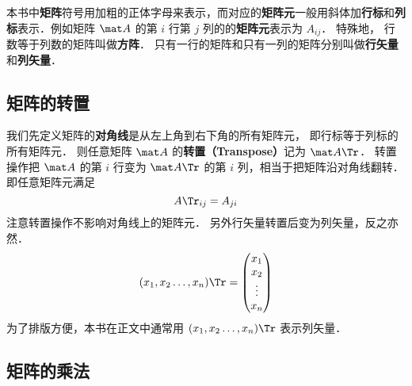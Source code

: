 

本书中\textbf{矩阵}符号用加粗的正体字母来表示，而对应的\textbf{矩阵元}一般用斜体加\textbf{行标}和\textbf{列标}表示．例如矩阵 $\mat A$ 的第 $i$ 行第 $j$ 列的的\textbf{矩阵元}表示为 $A_{ij}$． 特殊地， 行数等于列数的矩阵叫做\textbf{方阵}． 只有一行的矩阵和只有一列的矩阵分别叫做\textbf{行矢量}和\textbf{列矢量}．

\subsection{矩阵的转置}

我们先定义矩阵的\textbf{对角线}是从左上角到右下角的所有矩阵元， 即行标等于列标的所有矩阵元． 则任意矩阵 $\mat A$ 的\textbf{转置（Transpose）}记为 $\mat A\Tr$． 转置操作把 $\mat A$ 的第 $i$ 行变为 $\mat A\Tr$ 的第 $i$ 列，相当于把矩阵沿对角线翻转． 即任意矩阵元满足
\begin{equation}\label{Mat_eq3}
A\Tr_{ij} = A_{ji}
\end{equation}
注意转置操作不影响对角线上的矩阵元． 另外行矢量转置后变为列矢量，反之亦然．
\begin{equation}\label{Mat_eq2}
(x_1,x_2 \dots, x_n)\Tr = \begin{pmatrix} x_1\\x_2\\ \vdots\\x_n \end{pmatrix}
\end{equation}
为了排版方便，本书在正文中通常用 $(x_1,x_2 \dots, x_n)\Tr$ 表示列矢量．

\subsection{矩阵的乘法}

